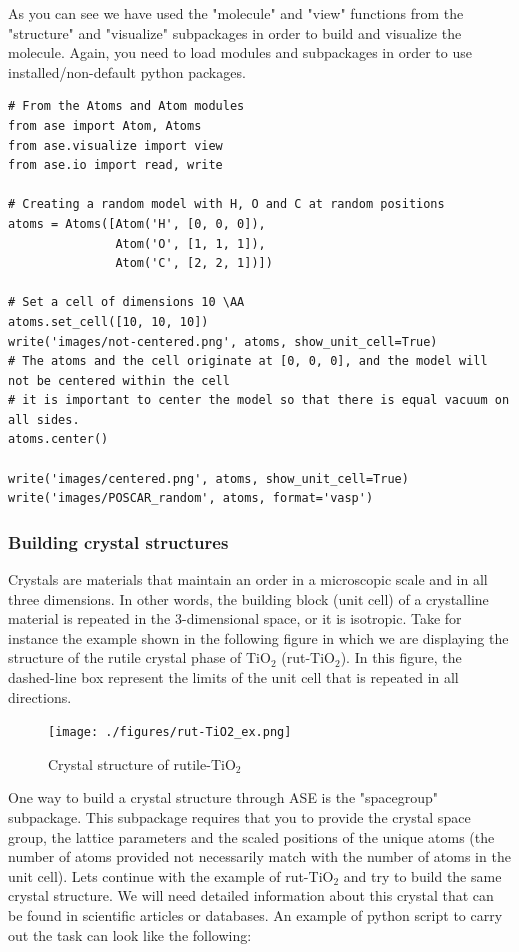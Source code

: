 \documentclass[11pt]{article}
\begin{document}
As you can see we have used the "molecule" and "view" functions from the "structure" and "visualize" subpackages in order to build and visualize the molecule. Again, you need to load modules and subpackages in order to use installed/non-default python packages.

\begin{verbatim}
# From the Atoms and Atom modules
from ase import Atom, Atoms
from ase.visualize import view
from ase.io import read, write

# Creating a random model with H, O and C at random positions
atoms = Atoms([Atom('H', [0, 0, 0]),
               Atom('O', [1, 1, 1]), 
               Atom('C', [2, 2, 1])])

# Set a cell of dimensions 10 \AA
atoms.set_cell([10, 10, 10])
write('images/not-centered.png', atoms, show_unit_cell=True)
# The atoms and the cell originate at [0, 0, 0], and the model will not be centered within the cell
# it is important to center the model so that there is equal vacuum on all sides.
atoms.center()

write('images/centered.png', atoms, show_unit_cell=True)
write('images/POSCAR_random', atoms, format='vasp')
\end{verbatim}

\subsubsection{Building crystal structures}
\label{sec-5-0-4}
Crystals are materials that maintain an order in a microscopic scale and in all three dimensions. In other words, the building block (unit cell) of a crystalline material is repeated in the 3-dimensional space, or it is isotropic. Take for instance the example shown in the following figure in which we are displaying the structure of the rutile crystal phase of TiO$_{\text{2}}$ (rut-TiO$_{\text{2}}$). In this figure, the dashed-line box represent the limits of the unit cell that is repeated in all directions.

\begin{figure}[htb]
\centering
\texttt{[image: ./figures/rut-TiO2\_ex.png]}
\caption{Crystal structure of rutile-TiO$_{\text{2}}$}
\end{figure}

One way to build a crystal structure through ASE is the "spacegroup" subpackage. This subpackage requires that you to provide the crystal space group, the lattice parameters and the scaled positions of the unique atoms (the number of atoms provided not necessarily match with the number of atoms in the unit cell). Lets continue with the example of rut-TiO$_{\text{2}}$ and try to build the same crystal structure. We will need detailed information about this crystal that can be found in scientific articles or databases. An example of python script to carry out the task can look like the following:
\end{document}
